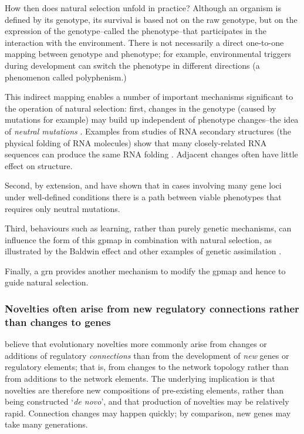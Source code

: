 How then does natural selection unfold in practice? Although an organism is defined by its genotype, its survival is based not on the raw genotype, but on the expression of the genotype--called the \gls{phenotype}--that participates in the interaction with the environment. There is not necessarily a direct one-to-one mapping between genotype and phenotype; for example, environmental triggers
during development can switch the phenotype in different directions (a phenomenon called \gls{polyphenism}.)

This indirect mapping enables a number of important mechanisms significant to the operation of natural selection: first, changes in the genotype (caused by mutations for example) may build up independent of phenotype changes--the idea of \emph{neutral mutations} \autocite{Ohta:1996vn,Ohta:2002ys,Ohta:1973kx}. Examples from studies of RNA secondary structures (the physical folding of RNA molecules) show that many closely-related RNA sequences can produce the same RNA folding \autocite{Fontana:1993zn}. Adjacent changes often have little effect on structure.

Second, by extension, \autocite{Gavrilets:1997qt} and \autocite{Gravner:2007yd} have shown that in cases involving many gene loci under well-defined conditions there is a path between viable phenotypes that requires only neutral mutations.

Third, behaviours such as learning, rather than purely genetic mechanisms, can influence the form of this \gls{gpmap} in combination with natural selection, as illustrated by the Baldwin effect \autocite{Baldwin:1896ly} and other examples of genetic assimilation \cite{Hinton:1987vy,Siegal:2002qn,Waddington:1942jb}.

Finally, a \gls{grn} provides another mechanism to modify the \gls{gpmap} and hence to guide natural selection.

\subsubsection{Novelties often arise from new regulatory connections rather than changes to genes}
\label{novelties-often-arise-from-new-regulatory-connections-rather-than-changes-to-genes}

\autocite{Prudhomme:2007ax} believe that evolutionary novelties more commonly arise from changes or additions of regulatory \emph{connections} than from the development of \emph{new} genes or regulatory elements; that is, from changes to the network topology rather than from additions to the network elements. The underlying implication is that novelties are therefore new compositions of
pre-existing elements, rather than being constructed `\emph{de novo}', and that production of novelties may be relatively rapid. Connection changes may happen quickly; by comparison, new genes may take many generations.

